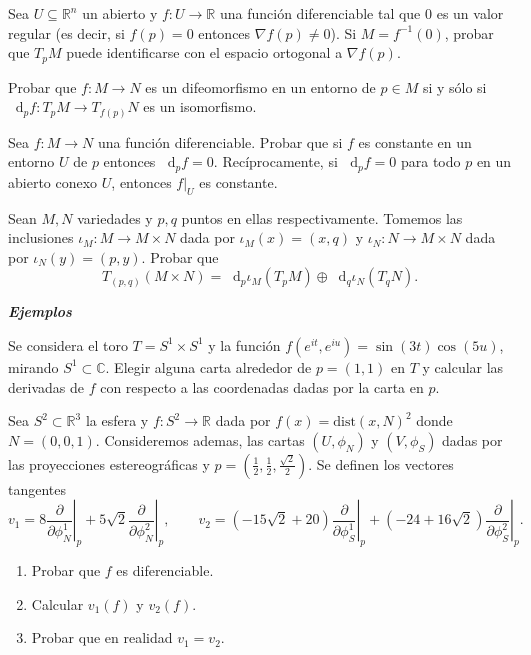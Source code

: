 \documentclass[11pt]{article}
\newcommand{\C}{\mathbb{C}}
\newcommand{\R}{{\mathbb{R}}}
\newcommand*\diff{\mathop{}\!\mathrm{d}}
\numberwithin{theorem}{subsection}
\begin{document}
\begin{question}
	Sea $U\subseteq\R^n$ un abierto y $f:U\to\R$ una funci\'on diferenciable tal que $0$ es un valor regular (es decir, si $f(p)=0$ entonces $\nabla f(p)\neq 0$). Si $M=f^{-1}(0)$, probar que $T_pM$ puede identificarse con el espacio ortogonal a $\nabla f(p)$.
\end{question}

\begin{question}
	Probar que $f:M\to N$ es un difeomorfismo en un entorno de $p\in M$ si y s\'olo si $\diff_p f:T_pM\to T_{f(p)}N$ es un isomorfismo. 
\end{question}

\begin{question}
	Sea $f:M\to N$ una funci\'on diferenciable. Probar que si $f$ es constante en un entorno $U$ de $p$ entonces $\diff_pf=0$. Rec\'iprocamente, si $\diff_p f=0$ para todo $p$ en un abierto conexo $U$, entonces $\left.f\right|_U$ es constante.
\end{question}

\begin{question}
	Sean $M,N$ variedades y $p,q$ puntos en ellas respectivamente. Tomemos las inclusiones $\iota_M:M\to M\times N$ dada por $\iota_M(x)=(x,q)$ y $\iota_N:N\to M\times N$ dada por $\iota_N(y)=(p,y)$. Probar que $$T_{(p,q)}(M\times N) = \diff_p\iota_M(T_pM)\oplus\diff_q\iota_N(T_qN).$$
\end{question}

\textsl{\textbf{Ejemplos}}
\vspace{1em}

\begin{question}
	Se considera el toro $T=S^1\times S^1$ y la funci\'on $f(e^{it},e^{iu})=\sin(3t)\cos(5u)$, mirando $S^1\subset\C$. Elegir alguna carta alrededor de $p=(1,1)$ en $T$ y calcular las derivadas de $f$ con respecto a las coordenadas dadas por la carta en $p$.
\end{question}

\begin{question}
	Sea $S^2\subset\R^3$ la esfera y $f:S^2\to\R$ dada por $f(x)=\mathrm{dist}(x,N)^2$ donde $N=(0,0,1)$. Consideremos ademas, las cartas $(U,\phi_N)$ y $(V,\phi_S)$ dadas por las proyecciones estereogr\'aficas y $p=(\frac{1}{2},\frac{1}{2},\frac{\sqrt{2}}{2})$.
	Se definen los vectores tangentes
	$$v_1=8\left.\dfrac{\partial}{\partial\phi_N^1}\right|_{p}+5\sqrt{2}\left.\dfrac{\partial}{\partial\phi_N^2}\right|_{p},\qquad v_2=(-15\sqrt 2+20)\left.\dfrac{\partial}{\partial\phi_S^1}\right|_{p}+(-24+16\sqrt{2})\left.\dfrac{\partial}{\partial\phi_S^2}\right|_{p}.$$
	\begin{enumerate}
		\item Probar que $f$ es diferenciable.
		\item Calcular $v_1(f)$ y $v_2(f)$.
		\item Probar que en realidad $v_1=v_2$.
	\end{enumerate}
\end{question}
\end{document}
